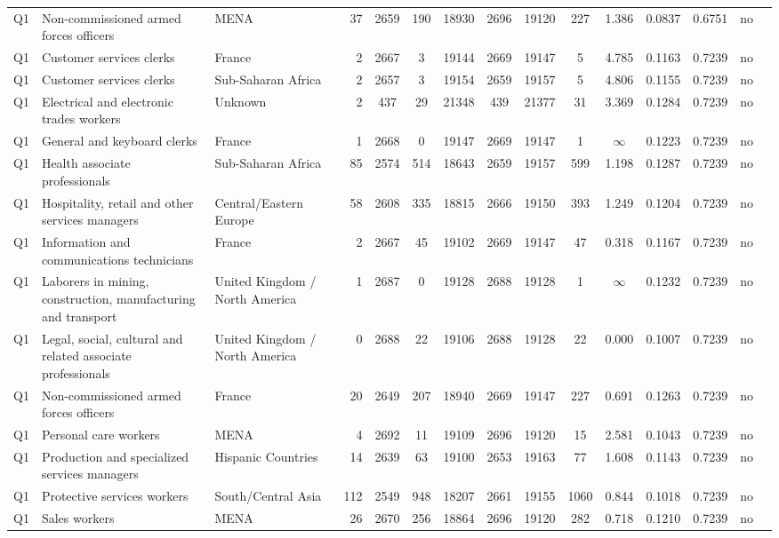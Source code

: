 \begin{longtable}{lllrcccccccccll}
Q1 & Non-commissioned armed forces officers & MENA & 37 & 2659 & 190 & 18930 & 2696 & 19120 & 227 & 1.386 & 0.0837 & 0.6751 & no \\
Q1 & Customer services clerks & France & 2 & 2667 & 3 & 19144 & 2669 & 19147 & 5 & 4.785 & 0.1163 & 0.7239 & no \\
Q1 & Customer services clerks & Sub-Saharan Africa & 2 & 2657 & 3 & 19154 & 2659 & 19157 & 5 & 4.806 & 0.1155 & 0.7239 & no \\
Q1 & Electrical and electronic trades workers & Unknown & 2 & 437 & 29 & 21348 & 439 & 21377 & 31 & 3.369 & 0.1284 & 0.7239 & no \\
Q1 & General and keyboard clerks & France & 1 & 2668 & 0 & 19147 & 2669 & 19147 & 1 & $\infty$ & 0.1223 & 0.7239 & no \\
Q1 & Health associate professionals & Sub-Saharan Africa & 85 & 2574 & 514 & 18643 & 2659 & 19157 & 599 & 1.198 & 0.1287 & 0.7239 & no \\
Q1 & Hospitality, retail and other services managers & Central/Eastern Europe & 58 & 2608 & 335 & 18815 & 2666 & 19150 & 393 & 1.249 & 0.1204 & 0.7239 & no \\
Q1 & Information and communications technicians & France & 2 & 2667 & 45 & 19102 & 2669 & 19147 & 47 & 0.318 & 0.1167 & 0.7239 & no \\
Q1 & Laborers in mining, construction, manufacturing and transport & United Kingdom / North America & 1 & 2687 & 0 & 19128 & 2688 & 19128 & 1 & $\infty$ & 0.1232 & 0.7239 & no \\
Q1 & Legal, social, cultural and related associate professionals & United Kingdom / North America & 0 & 2688 & 22 & 19106 & 2688 & 19128 & 22 & 0.000 & 0.1007 & 0.7239 & no \\
Q1 & Non-commissioned armed forces officers & France & 20 & 2649 & 207 & 18940 & 2669 & 19147 & 227 & 0.691 & 0.1263 & 0.7239 & no \\
Q1 & Personal care workers & MENA & 4 & 2692 & 11 & 19109 & 2696 & 19120 & 15 & 2.581 & 0.1043 & 0.7239 & no \\
Q1 & Production and specialized services managers & Hispanic Countries & 14 & 2639 & 63 & 19100 & 2653 & 19163 & 77 & 1.608 & 0.1143 & 0.7239 & no \\
Q1 & Protective services workers & South/Central Asia & 112 & 2549 & 948 & 18207 & 2661 & 19155 & 1060 & 0.844 & 0.1018 & 0.7239 & no \\
Q1 & Sales workers & MENA & 26 & 2670 & 256 & 18864 & 2696 & 19120 & 282 & 0.718 & 0.1210 & 0.7239 & no \\

\end{longtable}
